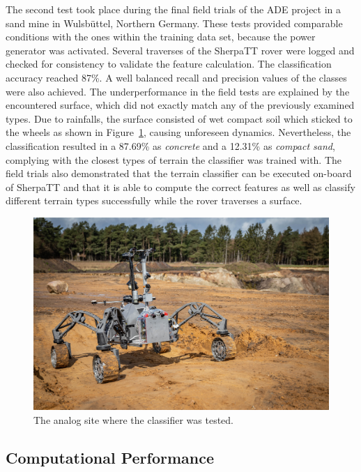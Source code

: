 The second test took place during the final field trials of the ADE project \cite{ocon2021} in a sand mine in Wulsbüttel, Northern Germany.
These tests provided comparable conditions with the ones within the training data set, because the power generator was activated. 
Several traverses of the SherpaTT rover were logged and checked for consistency to validate the feature calculation. 
The classification accuracy reached 87\%. 
A well balanced recall and precision values of the classes were also achieved. 
The underperformance in the field tests are explained by the encountered surface, which did not exactly match any of the previously examined types. 
Due to rainfalls, the surface consisted of wet compact soil which sticked to the wheels as shown in Figure~\ref{fig:finaltest}, causing unforeseen dynamics.
Nevertheless, the classification resulted in a 87.69\% as \emph{concrete} and a 12.31\% as \emph{compact sand}, complying with the closest types of terrain the classifier was trained with.
The field trials also demonstrated that the terrain classifier can be executed on-board of SherpaTT and that it is able to compute the correct features as well as classify different terrain types successfully while the rover traverses a surface.

\begin{figure}[!htbp]
    \centering
        \includegraphics[width=\columnwidth]{../figures/sandmine_v2.jpg}
    \caption{The analog site where the classifier was tested.}
    \label{fig:finaltest}
\end{figure}


\subsection{Computational Performance}


